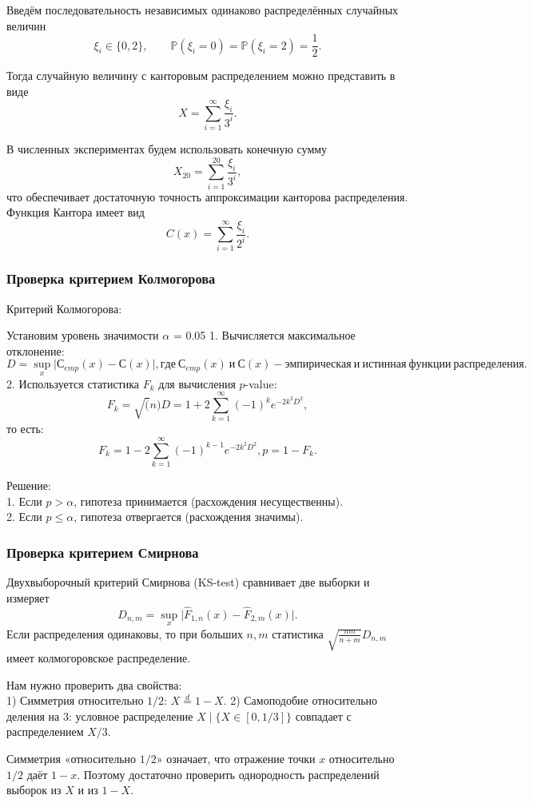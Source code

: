 \documentclass[11pt]{article}
\begin{document}
Введём последовательность независимых одинаково распределённых случайных величин
$$
\xi_i \in \{0, 2\}, \qquad \mathbb{P}(\xi_i = 0) = \mathbb{P}(\xi_i = 2) = \frac{1}{2}.
$$

Тогда случайную величину с канторовым распределением можно представить в виде
$$
X = \sum_{i=1}^{\infty} \frac{\xi_i}{3^i}.
$$

В численных экспериментах будем использовать конечную сумму
$$
X_{20} = \sum_{i=1}^{20} \frac{\xi_i}{3^i},
$$
что обеспечивает достаточную точность аппроксимации канторова распределения.\\
Функция Кантора имеет вид
$$
C(x) =  \sum_{i=1}^{\infty} \frac{\xi_i}{2^i}.
$$
\subsubsection{Проверка критерием Колмогорова}
Критерий Колмогорова:

Установим уровень значимости $\alpha$ = 0.05
1. Вычисляется максимальное отклонение:
$$
    D = \sup_x \lvert С_{emp}(x) - С(x) \rvert, где~С_{emp}(x)~и~С(x) - эмпирическая~и~истинная~функции~распределения.
$$
2. Используется статистика $ F_k $ для вычисления $ p $-value:
$$
    F_k = \sqrt(n) D = 1 + 2 \sum_{k=1}^\infty (-1)^{k} e^{-2k^2 D^2},    
$$
то есть:
$$
    F_k = 1 - 2 \sum_{k=1}^\infty (-1)^{k-1} e^{-2k^2 D^2},    
    p = 1 - F_k.
$$

Решение:\\
1. Если $ p > \alpha $, гипотеза принимается (расхождения несущественны).\\
2. Если $ p \leq \alpha $, гипотеза отвергается (расхождения значимы).


\subsubsection{Проверка критерием Смирнова}
Двухвыборочный критерий Смирнова (KS-test) сравнивает две выборки и измеряет
$$D_{n,m}=\sup_x\lvert \hat F_{1,n}(x)-\hat F_{2,m}(x)\rvert.$$
Если распределения одинаковы, то при больших $n,m$ статистика $\sqrt{\frac{nm}{n+m}}D_{n,m}$ имеет колмогоровское распределение.

Нам нужно проверить два свойства:\\
1) Симметрия относительно $1/2$: $X\overset{d}=1-X$.
2) Самоподобие относительно деления на 3: условное распределение $X\mid\{X\in[0,1/3]\}$ совпадает с распределением $X/3$.

Симметрия «относительно $1/2$» означает, что отражение точки $x$ относительно $1/2$ даёт $1-x$.
Поэтому достаточно проверить однородность распределений выборок из $X$ и из $1-X$.
\end{document}
